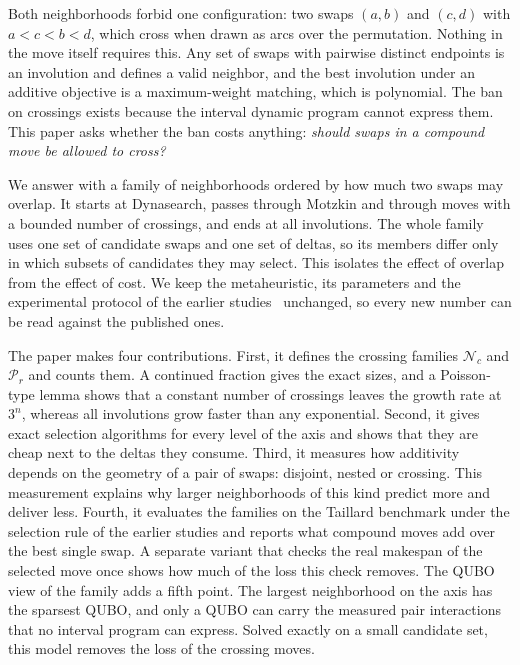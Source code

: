\documentclass[10pt,twocolumn]{article}
\newcommand{\N}{\mathcal{N}}
\newcommand{\Pa}{\mathcal{P}}
\begin{document}
Both neighborhoods forbid one configuration: two swaps $(a,b)$ and
$(c,d)$ with $a<c<b<d$, which cross when drawn as arcs over the
permutation. Nothing in the move itself requires this. Any set of swaps
with pairwise distinct endpoints is an involution and defines a valid
neighbor, and the best involution under an additive objective is a
maximum-weight matching, which is polynomial. The ban on crossings
exists because the interval dynamic program cannot express them. This
paper asks whether the ban costs anything: \emph{should swaps in a
compound move be allowed to cross?}

We answer with a family of neighborhoods ordered by how much two swaps
may overlap. It starts at Dynasearch, passes through Motzkin and through
moves with a bounded number of crossings, and ends at all involutions.
The whole family uses one set of candidate swaps and one set of deltas,
so its members differ only in which subsets of candidates they may
select. This isolates the effect of overlap from the effect of cost. We
keep the metaheuristic, its parameters and the experimental protocol of
the earlier studies~\cite{motzkin_own,windowed_own} unchanged, so every
new number can be read against the published ones.

The paper makes four contributions. First, it defines the crossing
families $\N_c$ and $\Pa_r$ and counts them. A continued fraction gives
the exact sizes, and a Poisson-type lemma shows that a constant number
of crossings leaves the growth rate at $3^n$, whereas all involutions
grow faster than any exponential. Second, it gives exact selection
algorithms for every level of the axis and shows that they are cheap
next to the deltas they consume. Third, it measures how additivity
depends on the geometry of a pair of swaps: disjoint, nested or
crossing. This measurement explains why larger neighborhoods of this
kind predict more and deliver less. Fourth, it evaluates the families on
the Taillard benchmark under the selection rule of the earlier studies
and reports what compound moves add over the best single swap. A
separate variant that checks the real makespan of the selected move
once shows how much of the loss this check removes. The QUBO view of
the family adds a fifth point. The largest neighborhood on the axis has
the sparsest QUBO, and only a QUBO can carry the measured pair
interactions that no interval program can express. Solved exactly on a
small candidate set, this model removes the loss of the crossing moves.

\end{document}

